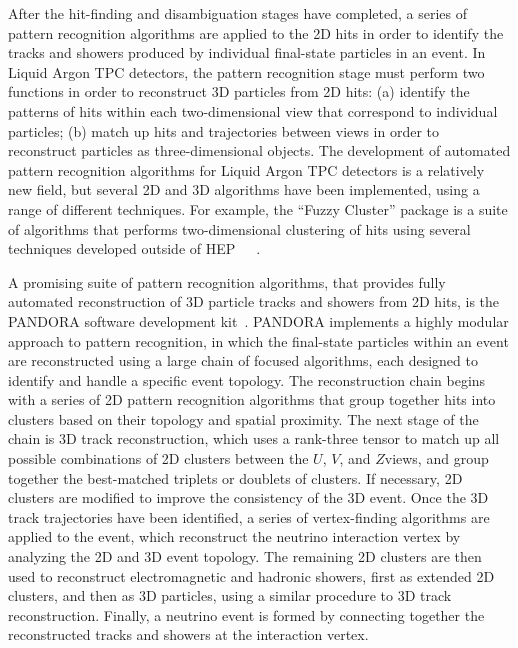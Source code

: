 After the hit-finding and disambiguation stages have completed, a series of 
pattern recognition algorithms are applied to the 2D hits in order to identify 
the tracks and showers produced by individual final-state particles in an event.
In Liquid Argon TPC detectors, the pattern recognition stage must perform 
two functions in order to reconstruct 3D particles from 2D hits:
(a) identify the patterns of hits within each two-dimensional view
that correspond to individual particles; (b) match up hits and trajectories
between views in order to reconstruct particles as three-dimensional objects.
The development of automated pattern recognition algorithms for Liquid Argon 
TPC detectors is a relatively new field, but several 2D and 3D algorithms
have been implemented, using a range of different techniques.
For example, the ``Fuzzy Cluster'' package is a suite of algorithms that
performs two-dimensional clustering of hits using several techniques developed 
outside of HEP~\cite{flameclustering}~\cite{pphtclustering}~\cite{Ester96adensity-based}.

A promising suite of pattern recognition algorithms, that provides fully 
automated reconstruction of 3D particle tracks and showers from 2D hits, 
is the PANDORA software development kit~\cite{Marshall:2013bda,Marshall:2012hh}.
PANDORA implements a highly modular approach to pattern recognition,
in which the final-state particles within an event are reconstructed using 
a large chain of focused algorithms, each designed to identify and handle
a specific event topology. The reconstruction chain begins with a 
series of 2D pattern recognition algorithms that group together hits 
into clusters based on their topology and spatial proximity.
The next stage of the chain is 3D track reconstruction, 
which uses a rank-three tensor to match up all possible combinations 
of 2D clusters between the $U$, $V$, and $Z$views, and group together 
the best-matched triplets or doublets of clusters. If necessary, 
2D clusters are modified to improve the consistency of the 3D event. 
Once the 3D track trajectories have been identified, 
a series of vertex-finding algorithms are applied to the event,
which reconstruct the neutrino interaction vertex by analyzing 
the 2D and 3D event topology. The remaining 2D clusters are then
used to reconstruct electromagnetic and hadronic showers,
first as extended 2D clusters, and then as 3D particles, 
using a similar procedure to 3D track reconstruction.
Finally, a neutrino event is formed by connecting together the 
reconstructed tracks and showers at the interaction vertex.


